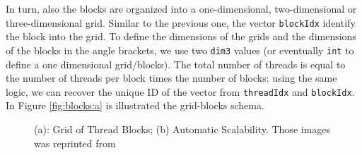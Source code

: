 In turn, also the blocks are organized into a one-dimensional, two-dimensional or three-dimensional grid. Similar to the previous one, the vector \verb|blockIdx| identify the block into the grid. To define the dimensions of the grids and the dimensions of the blocks in the angle brackets, we use two \verb|dim3| values (or eventually \verb|int| to define a one dimensional grid/blocks). The total number of threads is equal to the number of threads per block times the number of blocks: using the same logic, we can recover the unique ID of the vector from \verb|threadIdx| and \verb|blockIdx|. In Figure \ref{fig:blocks:a} is illustrated the grid-blocks schema.
\begin{figure}
	\hspace*{-4em}
	\hspace{1em}%
	\caption{(a): Grid of Thread Blocks; (b) Automatic Scalability. Those images was reprinted from \cite{cuda_manual} }
\end{figure}\\
